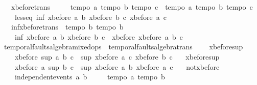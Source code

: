 \begin{isabellebody}
\ \ \ xbefore{\isacharunderscore}trans{\isacharcolon}\ \isanewline
\ \ \ \ {\isachardoublequoteopen}{\isasymlbrakk}tempo{}\ a{\isacharsemicolon}\ tempo{}\ b{\isacharsemicolon}\ tempo{}\ c{\isasymrbrakk}\ {\isasymLongrightarrow}\ {\isasymlbrakk}tempo{}\ a{\isacharsemicolon}\ tempo{}\ b{\isacharsemicolon}\ tempo{}\ c{\isasymrbrakk}\ {\isasymLongrightarrow}\isanewline
\ \ \ \ less{\isacharunderscore}eq\ {\isacharparenleft}inf\ {\isacharparenleft}xbefore\ a\ b{\isacharparenright}\ {\isacharparenleft}xbefore\ b\ c{\isacharparenright}{\isacharparenright}\ {\isacharparenleft}xbefore\ a\ c{\isacharparenright}{\isachardoublequoteclose}\isanewline
\ \ \ inf{\isacharunderscore}xbefore{\isacharunderscore}trans{\isacharcolon}\ {\isachardoublequoteopen}{\isasymlbrakk}\ tempo{}\ b{\isacharsemicolon}\ tempo{}\ b\ {\isasymrbrakk}\ {\isasymLongrightarrow}\isanewline
\ \ \ \ inf\ {\isacharparenleft}xbefore\ a\ b{\isacharparenright}\ {\isacharparenleft}xbefore\ b\ c{\isacharparenright}\ {\isacharequal}\ xbefore\ {\isacharparenleft}xbefore\ a\ b{\isacharparenright}\ c{\isachardoublequoteclose}%
\isamarkuptrue%
\isamarkupfalse%
\ temporal{\isacharunderscore}faults{\isacharunderscore}algebra{\isacharunderscore}mixed{\isacharunderscore}ops\ {\isacharequal}\ temporal{\isacharunderscore}faults{\isacharunderscore}algebra{\isacharunderscore}trans\ {\isacharplus}\isanewline
\ \ \ xbefore{\isacharunderscore}sup{\isacharunderscore}{}{\isacharcolon}\ \isanewline
\ \ \ \ {\isachardoublequoteopen}xbefore\ {\isacharparenleft}sup\ a\ b{\isacharparenright}\ c\ {\isacharequal}\ sup\ {\isacharparenleft}xbefore\ a\ c{\isacharparenright}\ {\isacharparenleft}xbefore\ b\ c{\isacharparenright}{\isachardoublequoteclose}\isanewline
\ \ \ xbefore{\isacharunderscore}sup{\isacharunderscore}{}{\isacharcolon}\ \isanewline
\ \ \ \ {\isachardoublequoteopen}xbefore\ a\ {\isacharparenleft}sup\ b\ c{\isacharparenright}\ {\isacharequal}\ sup\ {\isacharparenleft}xbefore\ a\ b{\isacharparenright}\ {\isacharparenleft}xbefore\ a\ c{\isacharparenright}{\isachardoublequoteclose}\isanewline
\ \ \ not{\isacharunderscore}xbefore{\isacharcolon}\ {\isachardoublequoteopen}\isanewline
\ \ \ \ independent{\isacharunderscore}events\ a\ b\ {\isasymLongrightarrow}\isanewline
\ \ \ \ {\isasymlbrakk}tempo{}\ a{\isacharsemicolon}\ tempo{}\ b{\isasymrbrakk}\ {\isasymLongrightarrow}\isanewline

\end{isabellebody}
